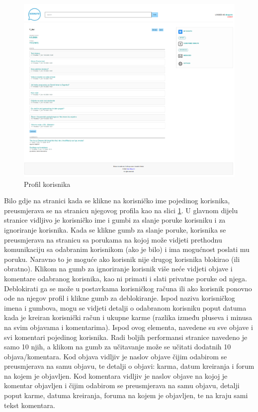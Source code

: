 \documentclass{foi}
\begin{document}
\begin{figure}[h!]
    \centering
    \includegraphics[width=1\textwidth]{slike/profil.png}
    \caption{Profil korisnika}
    \label{profil}
\end{figure}

Bilo gdje na stranici kada se klikne na korisničko ime pojedinog korisnika, preusmjerava se na stranicu njegovog profila kao na slici \ref{profil}. U glavnom dijelu stranice vidljivo je korisničko ime i gumbi za slanje poruke korisniku i za ignoriranje korisnika. Kada se klikne gumb za slanje poruke, korisnika se preusmjerava na stranicu sa porukama na kojoj može vidjeti prethodnu komunikaciju sa odabranim korisnikom (ako je bilo) i ima mogućnost poslati mu poruku. Naravno to je moguće ako korisnik nije drugog korisnika blokirao (ili obratno). Klikom na gumb za ignoriranje korisnik više neće vidjeti objave i komentare odabranog korisnika, kao ni primati i slati privatne poruke od njega. Deblokirati ga se može u postavkama korisničkog računa ili ako korisnik ponovno ode na njegov profil i klikne gumb za deblokiranje. Ispod naziva korisničkog imena i gumbova, mogu se vidjeti detalji o odabranom korisniku poput datuma kada je kreiran korisnički račun i ukupne karme (razlika između pluseva i minusa na svim objavama i komentarima). Ispod ovog elementa, navedene su sve objave i svi komentari pojedinog korisnika. Radi boljih performansi stranice navedeno je samo 10 njih, a klikom na gumb za učitavanje može se učitati dodatnih 10 objava/komentara. Kod objava vidljiv je naslov objave čijim odabirom se preusmjerava na samu objavu, te detalji o objavi: karma, datum kreiranja i forum na kojem je objavljen. Kod komentara vidljiv je naslov objave na kojoj je komentar objavljen i čijim odabirom se preusmjerava na samu objavu, detalji poput karme, datuma kreiranja, foruma na kojem je objavljen, te na kraju sami tekst komentara.
\end{document}
